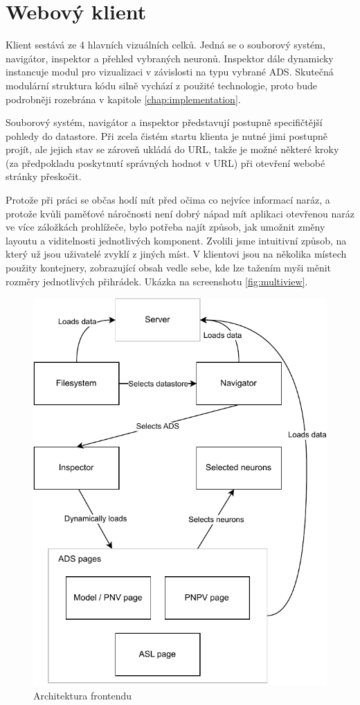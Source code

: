 \section{Webový klient}

Klient sestává ze 4 hlavních vizuálních celků. Jedná se o souborový systém, navigátor, inspektor a přehled vybraných neuronů. Inspektor dále dynamicky instancuje modul pro vizualizaci v závislosti na typu vybrané ADS. Skutečná modulární struktura kódu silně vychází z použité technologie, proto bude podrobněji rozebrána v kapitole \ref{chap:implementation}.

Souborový systém, navigátor a inspektor představují postupně specifičtější pohledy do datastore. Při zcela čistém startu klienta je nutné jimi postupně projít, ale jejich stav se zároveň ukládá do URL, takže je možné některé kroky (za předpokladu poskytnutí správných hodnot v URL) při otevření webobé stránky přeskočit.

Protože při práci se občas hodí mít před očima co nejvíce informací naráz, a protože kvůli paměťové náročnosti není dobrý nápad mít aplikaci otevřenou naráz ve více záložkách prohlížeče, bylo potřeba najít způsob, jak umožnit změny layoutu a viditelnosti jednotlivých komponent. Zvolili jsme intuitivní způsob, na který už jsou uživatelé zvyklí z jiných míst. V klientovi jsou na několika místech použity kontejnery, zobrazující obsah vedle sebe, kde lze tažením myši měnit rozměry jednotlivých přihrádek. Ukázka na screenshotu \ref{fig:multiview}.

\begin{figure}
  \centering
  \includegraphics[width=.7\linewidth]{img/frontend_diagram.pdf}
  \caption{Architektura frontendu}
\end{figure}

